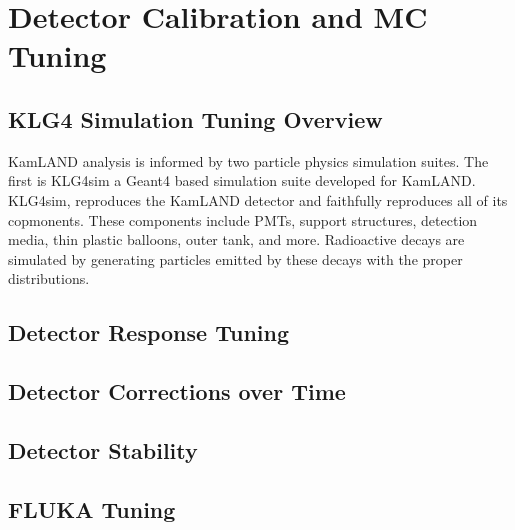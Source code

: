 \chapter{Detector Calibration and MC Tuning}
\label{chapter:calibartion}
\thispagestyle{myheadings}
\graphicspath{{4_Chapter_Calibration/Figures/}}


\section{KLG4 Simulation Tuning Overview}
KamLAND analysis is informed by two particle physics simulation suites. The first is KLG4sim a Geant4 based simulation suite developed for KamLAND. KLG4sim, reproduces the KamLAND detector and faithfully reproduces all of its copmonents. These components include PMTs, support structures, detection media, thin plastic balloons, outer tank, and more. Radioactive decays are simulated by generating particles emitted by these decays with the proper distributions.
\cite{klz800_arxiv}




\section{Detector Response Tuning}
\section{Detector Corrections over Time}
\section{Detector Stability}
\section{FLUKA Tuning}

